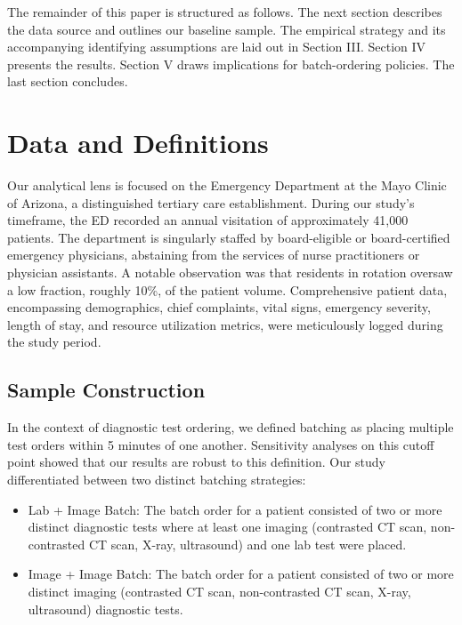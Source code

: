 \documentclass[,,nonblindrev]{informs}
\begin{document}
The remainder of this paper is structured as follows. The next section
describes the data source and outlines our baseline sample. The
empirical strategy and its accompanying identifying assumptions are laid
out in Section III. Section IV presents the results. Section V draws
implications for batch-ordering policies. The last section concludes.

\hypertarget{sec:II}{%
\section{Data and Definitions}\label{sec:II}}

Our analytical lens is focused on the Emergency Department at the Mayo
Clinic of Arizona, a distinguished tertiary care establishment. During
our study's timeframe, the ED recorded an annual visitation of
approximately 41,000 patients. The department is singularly staffed by
board-eligible or board-certified emergency physicians, abstaining from
the services of nurse practitioners or physician assistants. A notable
observation was that residents in rotation oversaw a low fraction,
roughly 10\%, of the patient volume. Comprehensive patient data,
encompassing demographics, chief complaints, vital signs, emergency
severity, length of stay, and resource utilization metrics, were
meticulously logged during the study period.

\hypertarget{sample-construction}{%
\subsection{Sample Construction}\label{sample-construction}}

In the context of diagnostic test ordering, we defined batching as
placing multiple test orders within 5 minutes of one another.
Sensitivity analyses on this cutoff point showed that our results are
robust to this definition. Our study differentiated between two distinct
batching strategies:

\begin{itemize}
\item Lab + Image Batch: The batch order for a patient consisted of two or more distinct diagnostic tests where at least one imaging (contrasted CT scan, non-contrasted CT scan, X-ray, ultrasound) and one lab test were placed.

\item Image + Image Batch: The batch order for a patient consisted of two or more distinct imaging (contrasted CT scan, non-contrasted CT scan, X-ray, ultrasound) diagnostic tests.
\end{itemize}
\end{document}
